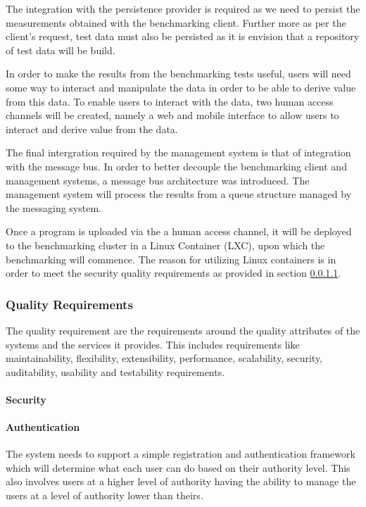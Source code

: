 The integration with the persistence provider is required as we need to persist
the measurements obtained with the benchmarking client. Further more as per the
client's request, test data must also be persisted as it is envision that a
repository of test data will be build.

In order to make the results from the benchmarking tests useful, users will
need some way to interact and manipulate the data in order to be able to
derive value from this data. To enable users to interact with the data,
two human access channels will be created, namely a web and mobile interface
to allow users to interact and derive value from the data.

The final intergration required by the management system is that of integration
with the message bus. In order to better decouple the benchmarking client and
management systems, a message bus architecture was introduced. The management
system will process the results from a queue structure managed by the messaging
system. 

Once a program is uploaded via the a human access channel, it will be deployed
to the benchmarking cluster in a Linux Container (LXC), upon which the
benchmarking will commence.  The reason for utilizing Linux containers is in
order to meet the security quality requirements as provided in
section \ref{sec:securityQualityRequirement}.

\subsubsection{Quality Requirements}
The quality requirement are the requirements around the quality attributes of
the systems and the services it provides. This includes requirements like
maintainability, flexibility, extensibility, performance, scalability, security,
auditability, usability and testability requirements.
\paragraph{Security}
\label{sec:securityQualityRequirement}
\paragraph{Authentication}
The system needs to support a simple registration and authentication framework
which will determine what each user can do based on their authority level. This
also involves users at a higher level of authority having the ability to manage
the users at a level of authority lower than theirs.
